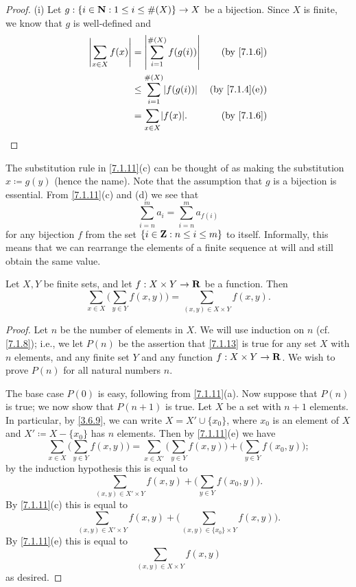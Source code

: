 \begin{proof}{(i)}
  Let \(g : \{i \in \mathbf{N} : 1 \leq i \leq \#(X)\} \to X\) be a bijection.
  Since \(X\) is finite, we know that \(g\) is well-defined and
  \begin{align*}
    \abs{\sum_{x \in X} f(x)} & = \abs{\sum_{i = 1}^{\#(X)} f(g(i))}    & \text{(by \cref{7.1.6})}    \\
                              & \leq \sum_{i = 1}^{\#(X)} \abs{f(g(i))} & \text{(by \cref{7.1.4}(e))} \\
                              & = \sum_{x \in X} \abs{f(x)}.            & \text{(by \cref{7.1.6})}
  \end{align*}
\end{proof}

\begin{remark}\label{7.1.12}
  The substitution rule in \cref{7.1.11}(c) can be thought of as making the substitution \(x \coloneqq g(y)\) (hence the name).
  Note that the assumption that \(g\) is a bijection is essential.
  From \cref{7.1.11}(c) and (d) we see that
  \[
    \sum_{i = n}^m a_i = \sum_{i = n}^m a_{f(i)}
  \]
  for any bijection \(f\) from the set \(\{i \in \mathbf{Z} : n \leq i \leq m\}\) to itself.
  Informally, this means that we can rearrange the elements of a finite sequence at will and still obtain the same value.
\end{remark}

\begin{lemma}\label{7.1.13}
  Let \(X, Y\) be finite sets, and let \(f : X \times Y \to \mathbf{R}\) be a function.
  Then
  \[
    \sum_{x \in X} \bigg(\sum_{y \in Y} f(x, y)\bigg) = \sum_{(x, y) \in X \times Y} f(x, y).
  \]
\end{lemma}

\begin{proof}
  Let \(n\) be the number of elements in \(X\).
  We will use induction on \(n\) (cf. \cref{7.1.8});
  i.e., we let \(P(n)\) be the assertion that \cref{7.1.13} is true for any set \(X\) with \(n\) elements, and any finite set \(Y\) and any function \(f : X \times Y \to \mathbf{R}\).
  We wish to prove \(P(n)\) for all natural numbers \(n\).

  The base case \(P(0)\) is easy, following from \cref{7.1.11}(a).
  Now suppose that \(P(n)\) is true;
  we now show that \(P(n + 1)\) is true.
  Let \(X\) be a set with \(n + 1\) elements.
  In particular, by \cref{3.6.9}, we can write \(X = X' \cup \{x_0\}\), where \(x_0\) is an element of \(X\) and \(X' \coloneqq X - \{x_0\}\) has \(n\) elements.
  Then by \cref{7.1.11}(e) we have
  \[
    \sum_{x \in X} \bigg(\sum_{y \in Y} f(x, y)\bigg) = \sum_{x \in X'} \bigg(\sum_{y \in Y} f(x, y)\bigg) + \bigg(\sum_{y \in Y} f(x_0, y)\bigg);
  \]
  by the induction hypothesis this is equal to
  \[
    \sum_{(x, y) \in X' \times Y} f(x, y) + \bigg(\sum_{y \in Y} f(x_0, y)\bigg).
  \]
  By \cref{7.1.11}(c) this is equal to
  \[
    \sum_{(x, y) \in X' \times Y} f(x, y) + \bigg(\sum_{(x, y) \in \{x_0\} \times Y} f(x, y)\bigg).
  \]
  By \cref{7.1.11}(e) this is equal to
  \[
    \sum_{(x, y) \in X \times Y} f(x, y)
  \]
  as desired.
\end{proof}


